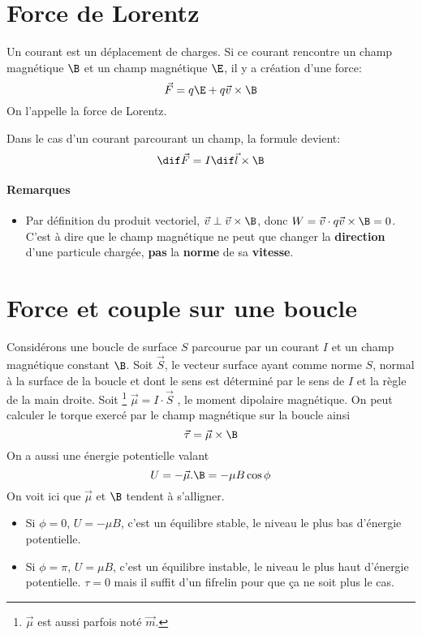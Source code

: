 \section{Force de Lorentz}
\label{sec:lorentz}
Un courant est un déplacement de charges.
Si ce courant rencontre un champ magnétique $\B$ et un champ magnétique $\E$, il y a création d'une force:
$$ \vec F = q \E + q \vec v \times \B $$
On l'appelle la force de Lorentz.

Dans le cas d'un courant parcourant un champ, la formule devient:
$$ \dif \vec F = I\dif \vec l \times \B $$

\paragraph{Remarques}
\begin{itemize}
	\item Par définition du produit vectoriel, $\vec v \perp \vec v \times \B$, donc $W = \vec v \cdot q\vec v \times \B = 0$.
		C'est à dire que le champ magnétique ne peut que changer la \textbf{direction} d'une particule chargée,
		\textbf{pas} la \textbf{norme} de sa \textbf{vitesse}.
\end{itemize}

\section{Force et couple sur une boucle}
Considérons une boucle de surface $S$ parcourue par un courant $I$ et un champ magnétique constant $\B$.
Soit $\vec S$, le vecteur surface ayant comme norme $S$, normal à la surface de la boucle et dont le sens est déterminé par le sens de $I$ et la règle de la main droite.
Soit
\footnote{$\vec \mu$ est aussi parfois noté $\vec m$.}
$\vec \mu = I \cdot \vec S$
, le moment dipolaire magnétique.
On peut calculer le torque exercé par le champ magnétique sur la boucle ainsi
\[ \vec \tau = \vec \mu \times \B \]
On a aussi une énergie potentielle valant
\[ U = -\vec \mu . \B = -\mu B \cos \phi \]
On voit ici que $\vec \mu$ et $\B$ tendent à s'alligner.
\begin{itemize}
	\item Si $\phi = 0$, $U = - \mu B$, c'est un équilibre stable, le niveau le plus bas d'énergie potentielle.
	\item Si $\phi = \pi$, $U = \mu B$, c'est un équilibre instable, le niveau le plus haut d'énergie potentielle.
		$\tau = 0$ mais il suffit d'un fifrelin pour que ça ne soit plus le cas.
\end{itemize}


